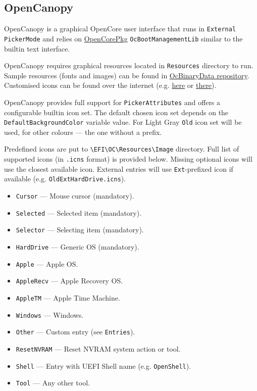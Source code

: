 \documentclass[]{article}
\providecommand{\tightlist}{%
  \setlength{\itemsep}{0pt}\setlength{\parskip}{0pt}}
\begin{document}
\subsection{OpenCanopy}\label{ueficanopy}

OpenCanopy is a graphical OpenCore user interface that runs in
\texttt{External} \texttt{PickerMode} and relies on
\href{https://github.com/acidanthera/OpenCorePkg}{OpenCorePkg} \texttt{OcBootManagementLib}
similar to the builtin text interface.

OpenCanopy requires graphical resources located in \texttt{Resources} directory to run.
Sample resources (fonts and images) can be found in
\href{https://github.com/acidanthera/OcBinaryData}{OcBinaryData repository}. Customised icons can be found over the internet
(e.g. \href{https://github.com/blackosx/OpenCanopyIcons}{here} or \href{https://applelife.ru/threads/kastomizacija-opencanopy.2945020/}{there}).

OpenCanopy provides full support for \texttt{PickerAttributes} and offers a configurable
builtin icon set. The default chosen icon set depends on the \texttt{DefaultBackgroundColor}
variable value. For Light Gray \texttt{Old} icon set will be used, for other colours ---
the one without a prefix.

Predefined icons are put to \texttt{\textbackslash EFI\textbackslash OC\textbackslash Resources\textbackslash Image}
directory. Full list of supported icons (in \texttt{.icns} format) is provided below. Missing optional
icons will use the closest available icon. External entries will use \texttt{Ext}-prefixed
icon if available (e.g. \texttt{OldExtHardDrive.icns}).

\begin{itemize}
\tightlist
  \item \texttt{Cursor} --- Mouse cursor (mandatory).
  \item \texttt{Selected} --- Selected item (mandatory).
  \item \texttt{Selector} --- Selecting item (mandatory).
  \item \texttt{HardDrive} --- Generic OS (mandatory).
  \item \texttt{Apple} --- Apple OS.
  \item \texttt{AppleRecv} --- Apple Recovery OS.
  \item \texttt{AppleTM} --- Apple Time Machine.
  \item \texttt{Windows} --- Windows.
  \item \texttt{Other} --- Custom entry (see \texttt{Entries}).
  \item \texttt{ResetNVRAM} --- Reset NVRAM system action or tool.
  \item \texttt{Shell} --- Entry with UEFI Shell name (e.g. \texttt{OpenShell}).
  \item \texttt{Tool} --- Any other tool.
\end{itemize}
\end{document}
